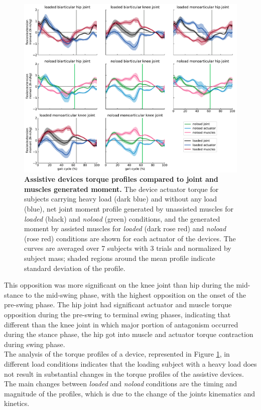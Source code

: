 \documentclass[10pt,letterpaper]{article}
\begin{document}
\begin{figure}[ht]   
	\centering
	\includegraphics[width=\linewidth]{Ideal_Exo_MonovsBi_Figures/PaperFigure_Exoskeletons_Torque.pdf}
	\vspace{1mm}
	\caption{{\small\textbf{Assistive devices torque profiles compared to joint and muscles generated moment.} The device actuator torque for subjects carrying heavy load (dark blue) and without any load (blue), net joint moment profile generated by unassisted muscles for \textit{loaded} (black) and \textit{noload} (green) conditions, and the generated moment by assisted muscles for \textit{loaded} (dark rose red) and \textit{noload} (rose red) conditions are shown for each actuator of the devices. The curves are averaged over 7 subjects with 3 trials and normalized by subject mass; shaded regions around the mean profile indicate standard deviation of the profile.}}
	\label{Fig_IdealExo_Torque}
\end{figure}
This opposition was more significant on the knee joint than hip during the mid-stance to the mid-swing phase, with the highest opposition on the onset of the pre-swing phase. The hip joint had significant actuator and muscle torque opposition during the pre-swing to terminal swing phases, indicating that different than the knee joint in which major portion of antagonism occurred during the stance phase, the hip got into muscle and actuator torque contraction during swing phase. \\
The analysis of the torque profiles of a device, represented in Figure \ref{Fig_IdealExo_Torque},  in different load conditions indicates that the loading subject with a heavy load does not result in substantial changes in the torque profiles of the assistive devices. The main changes between \textit{loaded} and \textit{noload} conditions are the timing and magnitude of the profiles, which is due to the change of the joints kinematics and kinetics.
\end{document}
